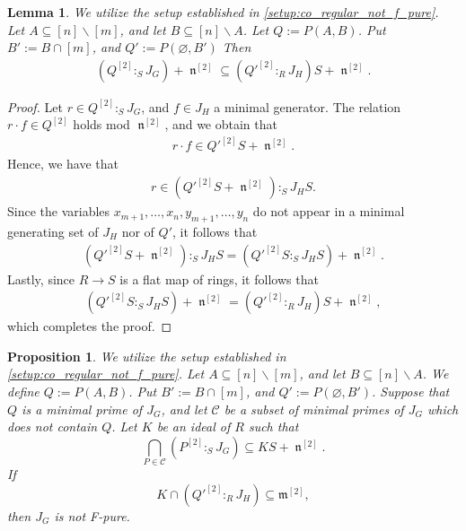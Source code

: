 \documentclass[12pt,a4paper]{amsart}
\theoremstyle{plain}
\newtheorem{prop}[thrm]{Proposition}
\def\bprop{\begin{prop}}
\def\eprop{\end{prop}}
\newtheorem{lem}[thrm]{Lemma}
\def\blem{\begin{lem}}
\def\elem{\end{lem}}
\theoremstyle{definition}
\def\bproof{\begin{proof}}
\def\eproof{\end{proof}}
\theoremstyle{remark}
\let\ra=\rightarrow
\let\setminus=\smallsetminus
\def\m{\mathfrak{m}}
\DeclareMathOperator{\n}{\mathfrak{n}}
\newcommand{\mc}[1]{\mathcal{ #1 }}
\renewcommand{\subset}{\subseteq}
\begin{document}
\blem 
\label{lem:reduction_Q_n_to_Q_5}
We utilize the setup established in \ref{setup:co_regular_not_f_pure}. Let $A \subset [n] \setminus [m]$, and let $B \subset [n] \setminus A$. Let $Q := P(A,B)$. Put $B' := B \cap [m]$, and $Q' := P(\varnothing,B')$ Then
\begin{align*}
    \left( Q^{[2]}:_{S} J_{G}  \right) + \n^{[2]} \subset \left( Q'^{[2]}:_{R} J_{H}  \right)S + \n^{[2]}.
\end{align*}
\elem 

\bproof
Let $r \in Q^{[2]}:_{S} J_{G} $, and $f \in J_{H}$ a minimal generator. The relation $r \cdot f \in Q^{[2]}$ holds mod $\n^{[2]}$, and we obtain that 
\begin{align*}
    r \cdot f \in Q'^{[2]}S + \n^{[2]}.
\end{align*}
Hence, we have that
\begin{align*}
    r \in (Q'^{[2]}S + \n^{[2]}) :_{S} J_{H}S.
\end{align*}
Since the variables $x_{m+1},\ldots,x_{n},y_{m+1},\ldots,y_{n}$ do not appear in a minimal generating set of $J_{H}$ nor of $Q'$, it follows that 
\begin{align*}
    (Q'^{[2]} S + \n^{[2]}) :_{S} J_{H}S = \left( Q'^{[2]} S  :_{S} J_{H}S \right) + \n^{[2]}.
\end{align*}
Lastly, since $R \ra S$ is a flat map of rings, it follows that 
\begin{align*}
   \left( Q'^{[2]} S  :_{S} J_{H}S \right) + \n^{[2]} =  \left( Q'^{[2]}  :_{R} J_{H} \right)S + \n^{[2]},
\end{align*}
which completes the proof.
\eproof

\bprop
\label{prop:reduction_step_fedder_computation}
We utilize the setup established in \ref{setup:co_regular_not_f_pure}. Let $A \subset [n] \setminus [m]$, and let $B \subset [n] \setminus A$. We define $Q := P(A,B)$. Put $B' := B \cap [m]$, and $Q' := P(\varnothing,B')$. Suppose that $Q$ is a minimal prime of $J_{G}$, and let $\mc{C}$ be a subset of minimal primes of $J_{G}$ which does not contain $Q$. Let $K$ be an ideal of $R$ such that 
\begin{equation}
    \label{eqn:reduction_step_fedder_computation_assumption_1}
    \bigcap_{P \in \mc{C}} \left( P^{[2]}:_{S} J_{G} \right) \subset K S + \n^{[2]}.
\end{equation}
If 
\begin{equation}
    \label{eqn:reduction_step_fedder_computation_assumption_2}
    K \cap ( Q'^{[2]} :_{R} J_{H}) \subset \m^{[2]},
\end{equation}
then $J_{G}$ is not F-pure.
\eprop 
\end{document}
